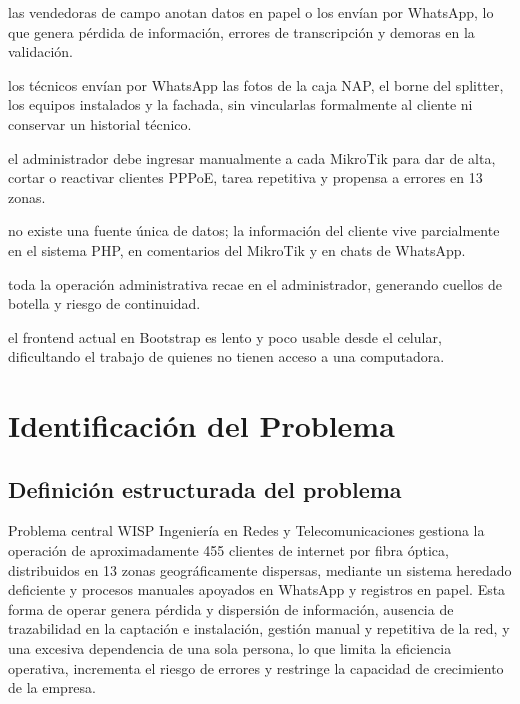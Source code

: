 \begin{description}[leftmargin=0pt, style=nextline]
  \item[Captación ineficiente:] las vendedoras de campo anotan datos en papel o los
  envían por WhatsApp, lo que genera pérdida de información, errores de transcripción
  y demoras en la validación.
  \item[Instalaciones sin registro estructurado:] los técnicos envían por WhatsApp las
  fotos de la caja NAP, el borne del splitter, los equipos instalados y la fachada, sin
  vincularlas formalmente al cliente ni conservar un historial técnico.
  \item[Gestión manual de la red:] el administrador debe ingresar manualmente a cada
  MikroTik para dar de alta, cortar o reactivar clientes PPPoE, tarea repetitiva y
  propensa a errores en 13 zonas.
  \item[Información dispersa y no confiable:] no existe una fuente única de datos; la
  información del cliente vive parcialmente en el sistema PHP, en comentarios del
  MikroTik y en chats de WhatsApp.
  \item[Dependencia de una sola persona:] toda la operación administrativa recae en el
  administrador, generando cuellos de botella y riesgo de continuidad.
  \item[Sistema heredado lento:] el frontend actual en Bootstrap es lento y poco usable
  desde el celular, dificultando el trabajo de quienes no tienen acceso a una computadora.
\end{description}

\section{Identificación del Problema}
\label{sec:problema}

\subsection{Definición estructurada del problema}

\begin{upeubox}{Problema central}
WISP Ingeniería en Redes y Telecomunicaciones gestiona la operación de
aproximadamente 455 clientes de internet por fibra óptica, distribuidos en 13 zonas
geográficamente dispersas, mediante un sistema heredado deficiente y procesos
manuales apoyados en WhatsApp y registros en papel. Esta forma de operar genera
pérdida y dispersión de información, ausencia de trazabilidad en la captación e
instalación, gestión manual y repetitiva de la red, y una excesiva dependencia de
una sola persona, lo que limita la eficiencia operativa, incrementa el riesgo de
errores y restringe la capacidad de crecimiento de la empresa.
\end{upeubox}

